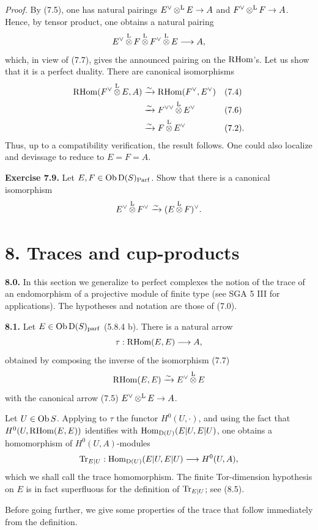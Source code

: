 \documentclass[11pt]{article}
\newcommand{\Parf}{\operatorname{Parf}}
\begin{document}
\emph{Proof.} By (7.5), one has natural pairings \(E^\vee\mathop{\otimes}^{\mathrm L} E\to A\) and \(F^\vee\mathop{\otimes}^{\mathrm L} F\to A\). Hence, by tensor product, one obtains a natural pairing
\[
  E^\vee\mathop{\otimes}^{\mathrm L} F\mathop{\otimes}^{\mathrm L} F^\vee\mathop{\otimes}^{\mathrm L} E\longrightarrow A,
\]
which, in view of (7.7), gives the announced pairing on the \(\mathrm R\!\operatorname{Hom}\)'s. Let us show that it is a perfect duality. There are canonical isomorphisms
\[
\begin{aligned}
\mathrm R\!\operatorname{Hom}(F^\vee\mathop{\otimes}^{\mathrm L} E,A)&\xrightarrow{\sim}\mathrm R\!\operatorname{Hom}(F^\vee,E^\vee) &&(7.4)\\
&\xrightarrow{\sim} F^{\vee\vee}\mathop{\otimes}^{\mathrm L} E^\vee &&(7.6)\\
&\xrightarrow{\sim} F\mathop{\otimes}^{\mathrm L} E^\vee &&(7.2).
\end{aligned}
\]
Thus, up to a compatibility verification, the result follows. One could also localize and devissage to reduce to \(E=F=A\).


\textbf{Exercise 7.9.} Let \(E,F\in\Ob\Dpx(S)_{\Parf}\). Show that there is a canonical isomorphism
\[
  E^\vee\mathop{\otimes}^{\mathrm L} F^\vee \xrightarrow{\sim} (E\mathop{\otimes}^{\mathrm L} F)^\vee .
\]

\section*{8. Traces and cup-products}

\textbf{8.0.} In this section we generalize to perfect complexes the notion of the trace of an endomorphism of a projective module of finite type (see SGA 5 III for applications). The hypotheses and notation are those of (7.0).

\textbf{8.1.} Let \(E\in\operatorname{Ob}\mathrm D(S)_{\mathrm{parf}}\) (5.8.4 b). There is a natural arrow
\[
  \tau:\mathrm R\!\operatorname{Hom}(E,E)\longrightarrow A,
\]
obtained by composing the inverse of the isomorphism (7.7)
\[
  \mathrm R\!\operatorname{Hom}(E,E)\xrightarrow{\sim}E^\vee\mathop{\otimes}^{\mathrm L} E
\]
with the canonical arrow (7.5) \(E^\vee\mathop{\otimes}^{\mathrm L} E\to A\).

Let \(U\in\operatorname{Ob} S\). Applying to \(\tau\) the functor \(H^0(U,\cdot)\), and using the fact that \(H^0(U,\mathrm R\!\operatorname{Hom}(E,E))\) identifies with \(\operatorname{Hom}_{\mathrm D(U)}(E|U,E|U)\), one obtains a homomorphism of \(H^0(U,A)\)-modules
\[
  \operatorname{Tr}_{E|U}:\operatorname{Hom}_{\mathrm D(U)}(E|U,E|U)\longrightarrow H^0(U,A),
\]
which we shall call the trace homomorphism. The finite Tor-dimension hypothesis on \(E\) is in fact superfluous for the definition of \(\operatorname{Tr}_{E|U}\); see (8.5).

Before going further, we give some properties of the trace that follow immediately from the definition.
\end{document}
